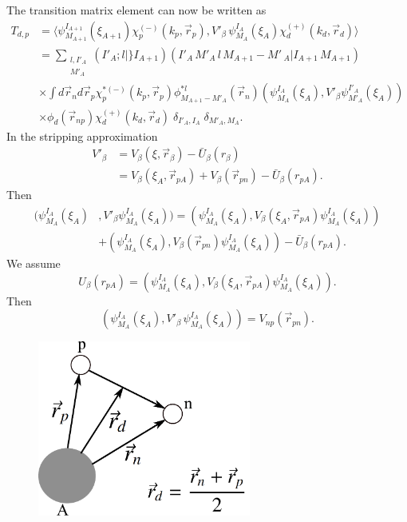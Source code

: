 \begin{subappendices}
The transition matrix element can now be written as
\begin{equation}\label{eq423}
 \begin{split}
T_{d,p}&= \langle \psi_{M_{A+1}}^{I_{A+1}}(\xi_{A+1}) \chi^{(-)}_p(k_p,\vec{r}_p),
V'_\beta \, \psi_{M_{A}}^{I_{A}}(\xi_{A}) \chi^{(+)}_d(k_d,\vec{r}_d)\rangle \\
&= \sum_{\substack{l,I'_A\\M'_A}} (I'_A;l \vert \} I_{A+1}) (I'_A \,M'_A\, l\, M_{A+1}-M'\,_A \vert I_{A+1}\,M_{A+1})\\
& \times\int d\vec{r}_n d \vec{r}_p \chi^{* (-)}_p(k_p,\vec{r}_p) \phi_{M_{A+1}-M'_A}^{*l}(\vec{r}_n)
(\psi_{M_{A}}^{I_{A}}(\xi_{A}),V'_\beta \psi_{M'_{A}}^{I'_{A}}(\xi_{A}))\\
& \times\phi_d(\vec r_{np})
\chi^{(+)}_d(k_d,\vec{r}_d) \; \delta_{I'_A,I_A} \; \delta_{M'_A,M_A}.
\end{split}
\end{equation}
In the stripping approximation
\begin{equation}\label{eq424}
 \begin{split}
V'_\beta & = V_\beta(\xi,\vec r_\beta)- \bar U_\beta (r_\beta)\\
&=V_\beta(\xi_A,\vec r_{pA})+V_\beta(\vec r_{pn})-\bar U_\beta (r_{pA}).
\end{split}
\end{equation}
Then
\begin{equation}\label{eq425}
 \begin{split}
(\psi_{M_{A}}^{I_{A}}(\xi_{A}) & ,V'_\beta \psi_{M_{A}}^{I_{A}}(\xi_{A}))=
(\psi_{M_{A}}^{I_{A}}(\xi_{A}), V_\beta(\xi_A,\vec r_{pA}) \psi_{M_{A}}^{I_{A}}(\xi_{A}))\\
&+(\psi_{M_{A}}^{I_{A}}(\xi_{A}), V_\beta(\vec r_{pn})
\psi_{M_{A}}^{I_{A}}(\xi_{A}))- \bar U_\beta (r_{pA}).
\end{split}
\end{equation}
We assume
\begin{equation}\label{eq426}
  U_\beta (r_{pA})=(\psi_{M_{A}}^{I_{A}}(\xi_{A}), V_\beta(\xi_A,\vec r_{pA}) \psi_{M_{A}}^{I_{A}}(\xi_{A})).
\end{equation}
Then
\begin{equation}\label{eq427}
(\psi_{M_{A}}^{I_{A}}(\xi_{A}), V'_\beta\, \psi_{M_{A}}^{I_{A}}(\xi_{A}))= V_{np}(\vec r_{pn}).
\end{equation}
 \begin{figure}
\centerline{\includegraphics*[width=7cm,angle=0]{C6/figs_C6/fig6_E1}}

\end{figure}
\end{subappendices}
